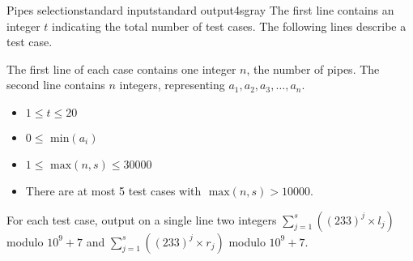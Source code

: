 \begin{problem}{Pipes selection}{standard input}{standard output}{4s}{gray}
The first line contains an integer $t$ indicating the total number of test cases.
The following lines describe a test case.

The first line of each case contains one integer $n$, 
the number of pipes.
The second line contains $n$ integers, representing $a_1, a_2, a_3,\ldots,a_n$.
\begin{itemize}
\item $1 \le t \le 20$
\item $0 \le \text{ min}(a_i)$
\item $1 \le \text{ max}(n,s) \le 30000$
\item There are at most 5 test cases with $\text{ max}(n,s)>10000$.
\end{itemize}

\OutputFile

For each test case, output on a single line two integers $\sum\limits_{j=1}^{s}((233)^j\times l_j)$ modulo $10^9+7$ and $\sum\limits_{j=1}^{s}((233)^j\times r_j)$ modulo $10^9+7$.

\Example

\begin{example}
%
\end{example}
\end{problem}
